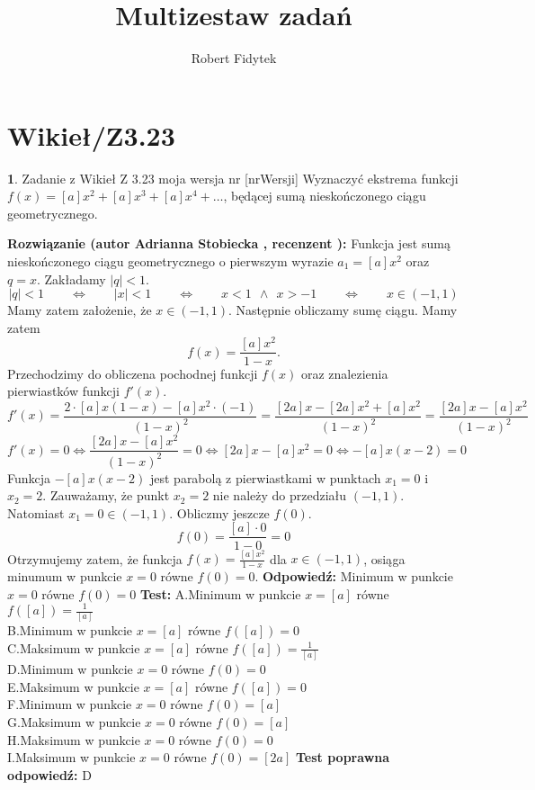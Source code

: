 \documentclass[12pt, a4paper]{article}
\title{Multizestaw zadań}
\author{Robert Fidytek}
\date{}
\theoremstyle{definition} %
\newtheorem{zad}{}
\newcommand{\kategoria}[1]{\section{#1}} %
\newcommand{\zadStart}[1]{\begin{zad}#1\newline} %
\newcommand{\zadStop}{\end{zad}}   %
\newcommand{\rozwStart}[2]{\noindent \textbf{Rozwiązanie (autor #1 , recenzent #2): }\newline} %
\newcommand{\rozwStop}{\newline}                                            %
\newcommand{\odpStart}{\noindent \textbf{Odpowiedź:}\newline}    %
\newcommand{\odpStop}{\newline}                                             %
\newcommand{\testStart}{\noindent \textbf{Test:}\newline} %
\newcommand{\testStop}{\newline} %
\newcommand{\kluczStart}{\noindent \textbf{Test poprawna odpowiedź:}\newline} %
\newcommand{\kluczStop}{\newline} %
\begin{document}
\maketitle


\kategoria{Wikieł/Z3.23}
\zadStart{Zadanie z Wikieł Z 3.23 moja wersja nr [nrWersji]}
%
Wyznaczyć ekstrema funkcji $f(x)=[a]x^2+[a]x^3+[a]x^4+\dots$, będącej sumą nieskończonego ciągu geometrycznego.
\zadStop
\rozwStart{Adrianna Stobiecka}{}
Funkcja jest sumą nieskończonego ciągu geometrycznego o pierwszym wyrazie $a_1=[a]x^2$ oraz $q=x$. Zakładamy $|q|<1$. 
$$|q|<1\qquad\Leftrightarrow\qquad|x|<1\qquad\Leftrightarrow\qquad x<1~~\land~~ x>-1\qquad\Leftrightarrow\qquad x\in(-1,1)$$
Mamy zatem założenie, że $x\in(-1,1)$. Następnie obliczamy sumę ciągu. Mamy zatem
$$f(x)=\frac{[a]x^2}{1-x}.$$
Przechodzimy do obliczena pochodnej funkcji $f(x)$ oraz znalezienia pierwiastków funkcji $f'(x)$.
$$f'(x)=\frac{2\cdot[a]x(1-x)-[a]x^2\cdot(-1)}{(1-x)^2}=\frac{[2a]x-[2a]x^2+[a]x^2}{(1-x)^2}=\frac{[2a]x-[a]x^2}{(1-x)^2}$$
$$f'(x)=0\Leftrightarrow\frac{[2a]x-[a]x^2}{(1-x)^2}=0\Leftrightarrow[2a]x-[a]x^2=0\Leftrightarrow-[a]x(x-2)=0$$
Funkcja $-[a]x(x-2)$ jest parabolą z pierwiastkami w punktach $x_1=0$ i $x_2=2$. Zauważamy, że punkt $x_2=2$ nie należy do przedziału $(-1,1)$. Natomiast $x_1=0\in(-1,1)$. Obliczmy jeszcze $f(0)$.
$$f(0)=\frac{[a]\cdot0}{1-0}=0$$
Otrzymujemy zatem, że funkcja $f(x)=\frac{[a]x^2}{1-x}$ dla $x\in(-1,1)$, osiąga minumum w punkcie $x=0$ równe $f(0)=0$.
\rozwStop
\odpStart
Minimum w punkcie $x=0$ równe $f(0)=0$
\odpStop
\testStart
A.Minimum w punkcie $x=[a]$ równe $f([a])=\frac{1}{[a]}$\\
B.Minimum w punkcie $x=[a]$ równe $f([a])=0$\\
C.Maksimum w punkcie $x=[a]$ równe $f([a])=\frac{1}{[a]}$\\
D.Minimum w punkcie $x=0$ równe $f(0)=0$\\
E.Maksimum w punkcie $x=[a]$ równe $f([a])=0$\\
F.Minimum w punkcie $x=0$ równe $f(0)=[a]$\\
G.Maksimum w punkcie $x=0$ równe $f(0)=[a]$\\
H.Maksimum w punkcie $x=0$ równe $f(0)=0$\\
I.Maksimum w punkcie $x=0$ równe $f(0)=[2a]$
\testStop
\kluczStart
D
\kluczStop
\end{document}
